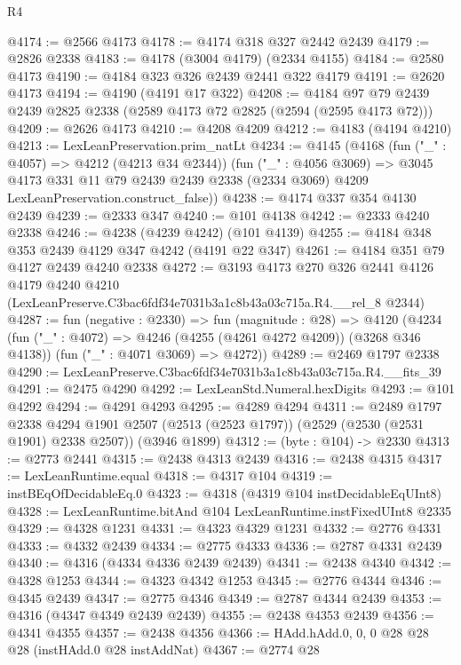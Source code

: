 \begin{lexlean}{R4}
\begin{coremodule}
@4174 := @2566 @4173
@4178 := @4174 @318 @327 @2442 @2439
@4179 := @2826 @2338
@4183 := @4178 (@3004 @4179) (@2334 @4155)
@4184 := @2580 @4173
@4190 := @4184 @323 @326 @2439 @2441 @322 @4179
@4191 := @2620 @4173
@4194 := @4190 (@4191 @17 @322)
@4208 := @4184 @97 @79 @2439 @2439 @2825 @2338 (@2589 @4173 @72 @2825 (@2594 (@2595 @4173 @72)))
@4209 := @2626 @4173
@4210 := @4208 @4209
@4212 := @4183 (@4194 @4210)
@4213 := LexLeanPreservation.prim_natLt
@4234 := @4145
    (@4168
      (fun ("_" : @4057) => @4212 (@4213 @34 @2344))
      (fun ("_" : @4056 @3069) =>
      @3045
        @4173
        @331
        @11
        @79
        @2439
        @2439
        @2338
        (@2334 @3069)
        @4209
        LexLeanPreservation.construct_false))
@4238 := @4174 @337 @354 @4130 @2439
@4239 := @2333 @347
@4240 := @101 @4138
@4242 := @2333 @4240 @2338
@4246 := @4238 (@4239 @4242) (@101 @4139)
@4255 := @4184 @348 @353 @2439 @4129 @347 @4242 (@4191 @22 @347)
@4261 := @4184 @351 @79 @4127 @2439 @4240 @2338
@4272 := @3193
    @4173
    @270
    @326
    @2441
    @4126
    @4179
    @4240
    @4210
    (LexLeanPreserve.C3bac6fdf34e7031b3a1c8b43a03c715a.R4.__rel_8 @2344)
@4287 := fun (negative : @2330) =>
  fun (magnitude : @28) =>
  @4120
    (@4234
      (fun ("_" : @4072) => @4246 (@4255 (@4261 @4272 @4209)) (@3268 @346 @4138))
      (fun ("_" : @4071 @3069) => @4272))
@4289 := @2469 @1797 @2338
@4290 := LexLeanPreserve.C3bac6fdf34e7031b3a1c8b43a03c715a.R4.__fits_39
@4291 := @2475 @4290
@4292 := LexLeanStd.Numeral.hexDigits
@4293 := @101 @4292
@4294 := @4291 @4293
@4295 := @4289 @4294
@4311 := @2489
    @1797
    @2338
    @4294
    @1901
    @2507
    (@2513 (@2523 @1797))
    (@2529 (@2530 (@2531 @1901) @2338 @2507))
    (@3946 @1899)
@4312 := (byte : @104) -> @2330
@4313 := @2773 @2441
@4315 := @2438 @4313 @2439
@4316 := @2438 @4315
@4317 := LexLeanRuntime.equal
@4318 := @4317 @104
@4319 := instBEqOfDecidableEq.{0}
@4323 := @4318 (@4319 @104 instDecidableEqUInt8)
@4328 := LexLeanRuntime.bitAnd @104 LexLeanRuntime.instFixedUInt8 @2335
@4329 := @4328 @1231
@4331 := @4323 @4329 @1231
@4332 := @2776 @4331
@4333 := @4332 @2439
@4334 := @2775 @4333
@4336 := @2787 @4331 @2439
@4340 := @4316 (@4334 @4336 @2439 @2439)
@4341 := @2438 @4340
@4342 := @4328 @1253
@4344 := @4323 @4342 @1253
@4345 := @2776 @4344
@4346 := @4345 @2439
@4347 := @2775 @4346
@4349 := @2787 @4344 @2439
@4353 := @4316 (@4347 @4349 @2439 @2439)
@4355 := @2438 @4353 @2439
@4356 := @4341 @4355
@4357 := @2438 @4356
@4366 := HAdd.hAdd.{0, 0, 0} @28 @28 @28 (instHAdd.{0} @28 instAddNat)
@4367 := @2774 @28

\end{coremodule}
\end{lexlean}
